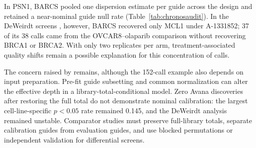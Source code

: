 In PSN1, BARCS pooled one dispersion estimate per guide across the design and
retained a near-nominal guide null rate (Table~\ref{tab:chronosaudit}).  In
the DeWeirdt screens \citep{deweirdt2020isogenic}, however, BARCS recovered
only MCL1 under A-1331852; 37 of its 38 calls came from the OVCAR8--olaparib
comparison without recovering BRCA1 or BRCA2.  With only two replicates per
arm, treatment-associated quality shifts remain a possible explanation for
this concentration of calls.

The concern raised by \citet{dempster2025fdr} remains, although the 152-call
example also depends on input preparation.  Pre-fit guide subsetting and
common normalization can alter the effective depth in a
library-total-conditional model.  Zero Avana discoveries after restoring the
full total do not demonstrate nominal calibration: the largest
cell-line-specific $p<0.05$ rate remained 0.145, and the DeWeirdt analysis
remained unstable.  Comparator studies must preserve full-library totals,
separate calibration guides from evaluation guides, and use blocked
permutations or independent validation for differential screens.
